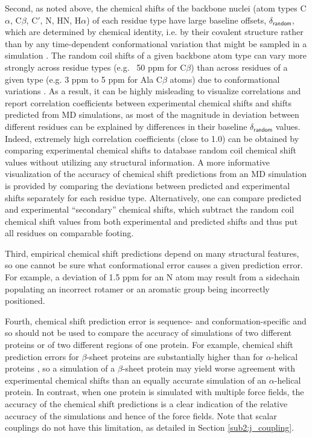 \documentclass[9pt,review]{livecoms}
\begin{document}
Second, as noted above, the chemical shifts of the backbone nuclei (atom types C$\alpha$, C$\beta$, C$'$, N, HN, H$\alpha$) of each residue type have large baseline offsets, $\delta_{\mathsf{random}}$, which are determined by chemical identity, i.e. by their covalent structure rather than by any time-dependent conformational variation that might be sampled in a simulation \cite{schwarzinger_sequence-dependent_2001,de_simone_accurate_2009,tamiola_sequence-specific_2010,kjaergaard_sequence_2011}.
The random coil shifts of a given backbone atom type can vary more strongly across residue types (e.g. ~50 ppm for C$\beta$) than across residues of a given type (e.g. 3 ppm to 5 ppm for Ala C$\beta$ atoms) due to conformational variations \cite{ulrich_biomagresbank_2008,romero_biomagresbank_2020}.
As a result, it can be highly misleading to visualize correlations and report correlation coefficients between experimental chemical shifts and shifts predicted from MD simulations, as most of the magnitude in deviation between different residues can be explained by differences in their baseline $\delta_{\mathsf{random}}$ values.
Indeed, extremely high correlation coefficients (close to 1.0) can be obtained by comparing experimental chemical shifts to database random coil chemical shift values without utilizing any structural information.
A more informative visualization of the accuracy of chemical shift predictions from an MD simulation is provided by comparing the deviations between predicted and experimental shifts separately for each residue type.
Alternatively, one can compare predicted and experimental “secondary” chemical shifts, which subtract the random coil chemical shift values from both experimental and predicted shifts and thus put all residues on comparable footing.

Third, empirical chemical shift predictions depend on many structural features, so one cannot be sure what conformational error causes a given prediction error. For example, a deviation of 1.5 ppm for an N atom may result from a sidechain populating an incorrect rotamer or an aromatic group being incorrectly positioned.

Fourth, chemical shift prediction error is sequence- and conformation-specific and so should not be used to compare the accuracy of simulations of two different proteins or of two different regions of one protein.
For example, chemical shift prediction errors for $\beta$-sheet proteins are substantially higher than for $\alpha$-helical proteins \cite{yang_predicting_2021}, so a simulation of a $\beta$-sheet protein may yield worse agreement with experimental chemical shifts than an equally accurate simulation of an $\alpha$-helical protein.
In contrast, when one protein is simulated with multiple force fields, the accuracy of the chemical shift predictions is a clear indication of the relative accuracy of the simulations and hence of the force fields.
Note that scalar couplings do not have this limitation, as detailed in Section \ref{sub2:j_coupling}.
\end{document}
